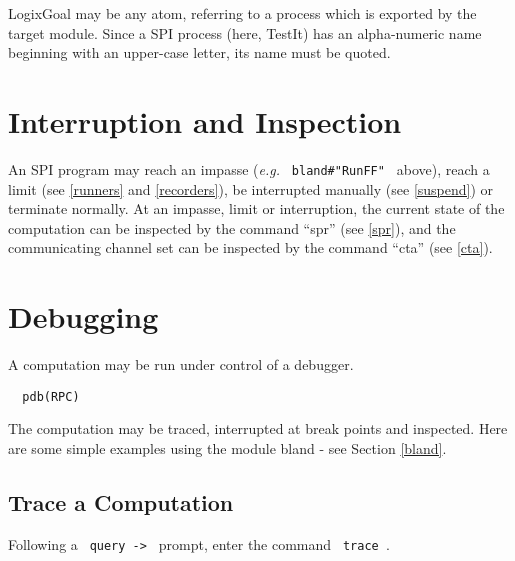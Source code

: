 \noindent
LogixGoal may be any atom, referring to a process which is exported by
the target module.  Since a SPI process (here, TestIt) has an
alpha-numeric name
beginning with an upper-case letter, its name must be quoted.

\section{Interruption and Inspection}

An SPI program may reach an impasse ({\em e.g.} \verb+ bland#"RunFF" +
above), reach a limit (see \ref{runners} and \ref{recorders}), be interrupted
manually (see \ref{suspend}) or terminate normally.  At an impasse,
limit or interruption, the current state of the
computation can be inspected by the command ``spr'' (see \ref{spr}),
and the communicating channel set can be inspected by the command ``cta''
(see \ref{cta}).

\section{Debugging}
\label{debugger}

A computation may be run under control of a debugger.

\begin{verbatim}
  pdb(RPC)
\end{verbatim}

\noindent
The computation may be traced, interrupted at break points and
inspected.  Here are some simple examples using the module bland -
see Section \ref{bland}.

\subsection{Trace a Computation}
\label{debug trace}

Following a \verb+ query -> + prompt, enter the command \verb+ trace +.

